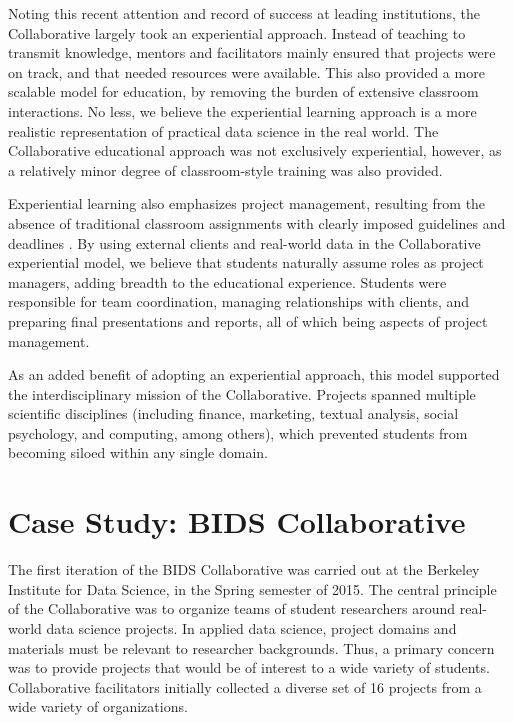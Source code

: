 \documentclass[12pt]{article}
\begin{document}
Noting this recent attention and record of success at leading institutions, the Collaborative largely took an experiential approach.  Instead of teaching to transmit knowledge, mentors and facilitators mainly ensured that projects were on track, and that needed resources were available.  This also provided a more scalable model for education, by removing the burden of extensive classroom interactions.  No less, we believe the experiential learning approach is a more realistic representation of practical data science in the real world. The Collaborative educational approach was not exclusively experiential, however, as a relatively minor degree of classroom-style training was also provided.

Experiential learning also emphasizes project management, resulting from the absence of traditional classroom assignments with clearly imposed guidelines and deadlines \citep{mok2014teaching}.  By using external clients and real-world data in the Collaborative experiential model, we believe that students naturally assume roles as project managers, adding breadth to the educational experience.  Students were responsible for team coordination, managing relationships with clients, and preparing final presentations and reports, all of which being aspects of project management.

As an added benefit of adopting an experiential approach, this model supported the interdisciplinary mission of the Collaborative.  Projects spanned multiple scientific disciplines (including finance, marketing, textual analysis, social psychology, and computing, among others), which prevented students from becoming siloed within any single domain.



\section{Case Study: BIDS Collaborative}

The first iteration of the BIDS Collaborative was carried out at the Berkeley Institute for Data Science, in the Spring semester of 2015.  The central principle of the Collaborative was to organize teams of student researchers around real-world data science projects. In applied data science, project domains and materials must be relevant to researcher backgrounds. Thus, a primary concern was to provide projects that would be of interest to a wide variety of students.  Collaborative facilitators initially collected a diverse set of 16 projects from a wide variety of organizations.
\end{document}
